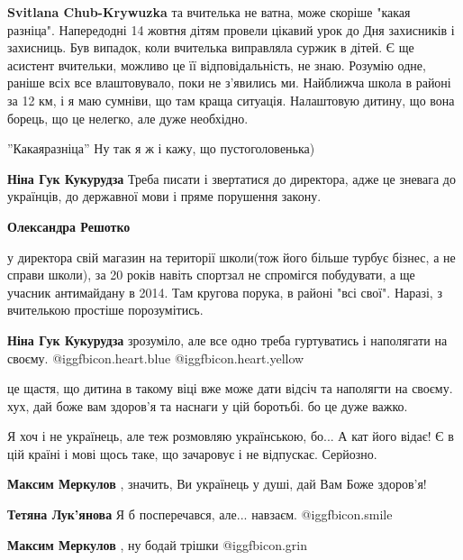 \begin{itemize}
\begin{itemize}
\textbf{Svitlana Chub-Krywuzka} та вчителька не ватна, може скоріше "какая разніца". Напередодні 14 жовтня дітям провели цікавий урок до Дня захисників і захисниць. Був випадок, коли вчителька виправляла суржик в дітей. Є ще асистент вчительки, можливо це її відповідальність, не знаю. Розумію одне, раніше всіх все влаштовувало, поки не з'явились ми. Найближча школа в районі за 12 км, і я маю сумніви, що там краща ситуація. Налаштовую дитину, що вона борець, що це нелегко, але дуже необхідно.

''Какаяразніца''
Ну так я ж і кажу, що пустоголовенька)

\textbf{Ніна Гук Кукурудза} Треба писати і звертатися до директора, адже це зневага до українців, до державної мови і пряме порушення закону.

\textbf{Олександра Решотко} 

у директора свій магазин на території школи(тож його більше турбує бізнес, а не
справи школи), за 20 років навіть спортзал не спромігся побудувати, а ще
учасник антимайдану в 2014. Там кругова порука, в районі "всі свої". Наразі, з
вчителькою простіше порозумітись.

\textbf{Ніна Гук Кукурудза} зрозуміло, але все одно треба гуртуватись і наполягати на своєму. @igg{fbicon.heart.blue}  @igg{fbicon.heart.yellow} 

\end{itemize} %


це щастя, що дитина в такому віці вже може дати відсіч та наполягти на своєму.
хух, дай боже вам здоров'я та наснаги у цій боротьбі. бо це дуже важко.



Я хоч і не українець, але теж розмовляю українською, бо... А кат його відає! Є
в цій країні і мові щось таке, що зачаровує і не відпускає. Серйозно.

\begin{itemize} %
\textbf{Максим Меркулов} , значить, Ви українець у душі, дай Вам Боже здоров'я!

\textbf{Тетяна Лук'янова} Я б посперечався, але... навзаєм.  @igg{fbicon.smile} 

\textbf{Максим Меркулов} , ну бодай трішки  @igg{fbicon.grin} 


\end{itemize}
\end{itemize}
